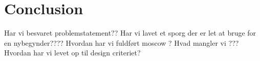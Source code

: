 \chapter{Conclusion}
\label{chap:Conclusion}
Har vi besvaret problemstatement??
Har vi lavet et sporg der er let at bruge for en nybegynder????
Hvordan har vi fuldført moscow ? Hvad mangler vi ???
Hvordan har vi levet op til design criteriet?


